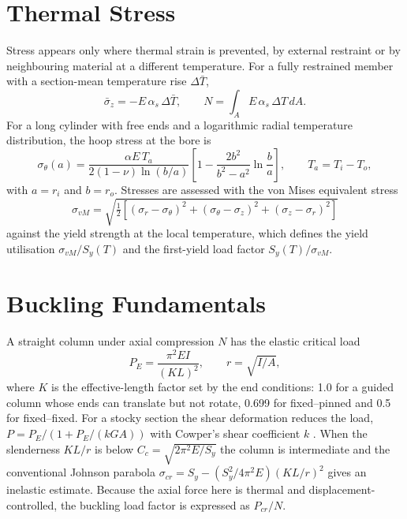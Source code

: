 \section{Thermal Stress}
Stress appears only where thermal strain is prevented, by external restraint or by neighbouring material at a different temperature. For a
fully restrained member with a section-mean temperature rise $\Delta\bar T$,
\begin{equation}
\bar\sigma_z = -E\,\alpha_s\,\Delta\bar T, \qquad N = \int_A E\,\alpha_s\,\Delta T\,dA .
\label{eq:restrained}
\end{equation}
For a long cylinder with free ends and a logarithmic radial temperature distribution, the hoop stress at the bore is
\cite{timoshenko}
\begin{equation}
\sigma_\theta(a) = \frac{\alpha E\,T_a}{2(1-\nu)\ln(b/a)}\left[1 - \frac{2b^2}{b^2-a^2}\ln\frac{b}{a}\right], \qquad T_a = T_i - T_o ,
\label{eq:timoshenko}
\end{equation}
with $a = r_i$ and $b = r_o$. Stresses are assessed with the von Mises equivalent stress
\begin{equation}
\sigma_{vM} = \sqrt{\tfrac12\left[(\sigma_r-\sigma_\theta)^2 + (\sigma_\theta-\sigma_z)^2 + (\sigma_z-\sigma_r)^2\right]}
\label{eq:vm}
\end{equation}
against the yield strength at the local temperature, which defines the yield utilisation $\sigma_{vM}/S_y(T)$ and the first-yield load
factor $S_y(T)/\sigma_{vM}$.

\section{Buckling Fundamentals}
A straight column under axial compression $N$ has the elastic critical load
\begin{equation}
P_E = \frac{\pi^2 E I}{(K L)^2}, \qquad r = \sqrt{I/A},
\label{eq:euler}
\end{equation}
where $K$ is the effective-length factor set by the end conditions: 1.0 for a guided column whose ends can translate but not rotate,
0.699 for fixed--pinned and 0.5 for fixed--fixed. For a stocky section the shear deformation reduces the load,
$P = P_E/\left(1 + P_E/(k G A)\right)$ with Cowper's shear coefficient $k$ \cite{cowper1966}. When the slenderness $KL/r$ is below
$C_c = \sqrt{2\pi^2E/S_y}$ the column is intermediate and the conventional Johnson parabola
$\sigma_{cr} = S_y - \left(S_y^2/4\pi^2E\right)(KL/r)^2$ gives an inelastic estimate. Because the axial force here is thermal and
displacement-controlled, the buckling load factor is expressed as $P_{cr}/N$.

